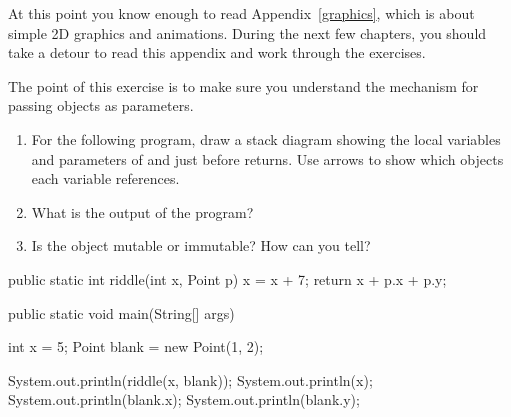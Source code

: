 At this point you know enough to read Appendix~\ref{graphics}, which is about simple 2D graphics and animations.
During the next few chapters, you should take a detour to read this appendix and work through the exercises.


\begin{exercise}  %

The point of this exercise is to make sure you understand the mechanism for passing objects as parameters.

\begin{enumerate}

\item For the following program, draw a stack diagram showing the local variables and parameters of  and  just before  returns.
Use arrows to show which objects each variable references.

\item What is the output of the program?

\item Is the  object mutable or immutable?
How can you tell?

\end{enumerate}

\begin{code}
public static int riddle(int x, Point p) {
    x = x + 7;
    return x + p.x + p.y;
}
\end{code}

\begin{code}
public static void main(String[] args) {
    int x = 5;
    Point blank = new Point(1, 2);

    System.out.println(riddle(x, blank));
    System.out.println(x);
    System.out.println(blank.x);
    System.out.println(blank.y);
}
\end{code}

\end{exercise}


